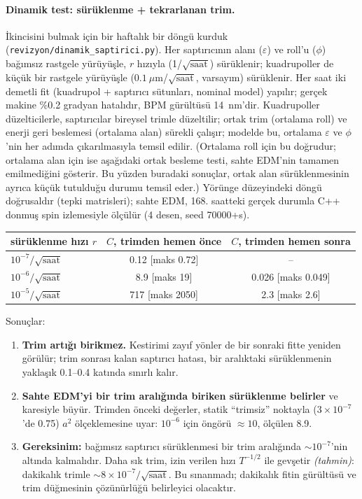 \documentclass[11pt,a4paper]{article}
\newcommand{\tahmin}{\textit{(tahmin)}}
\begin{document}
\paragraph{Dinamik test: sürüklenme + tekrarlanan trim.} İkincisini bulmak için bir haftalık bir döngü kurduk
(\texttt{revizyon/dinamik\_saptirici.py}). Her saptırıcının alanı ($\varepsilon$) ve roll'u ($\phi$) bağımsız
rastgele yürüyüşle, $r$ hızıyla (1/$\sqrt{\text{saat}}$) sürüklenir; kuadrupoller de küçük bir rastgele
yürüyüşle ($0.1~\mu$m/$\sqrt{\text{saat}}$, varsayım) sürüklenir. Her saat iki demetli fit (kuadrupol +
saptırıcı sütunları, nominal model) yapılır; gerçek makine \%0.2 gradyan hatalıdır, BPM gürültüsü 14~nm'dir.
Kuadrupoller düzelticilerle, saptırıcılar bireysel trimle düzeltilir; ortak trim (ortalama roll) ve enerji
geri beslemesi (ortalama alan) sürekli çalışır; modelde bu, ortalama $\varepsilon$ ve $\phi$'nin her adımda
çıkarılmasıyla temsil edilir. (Ortalama roll için bu doğrudur; ortalama alan için ise aşağıdaki ortak besleme
testi, sahte EDM'nin tamamen emilmediğini gösterir. Bu yüzden buradaki sonuçlar, ortak alan sürüklenmesinin
ayrıca küçük tutulduğu durumu temsil eder.) Yörünge düzeyindeki döngü doğrusaldır (tepki matrisleri);
sahte EDM, 168. saatteki gerçek durumla C++ donmuş spin izlemesiyle ölçülür (4 desen, seed 70000+s).
\begin{center}\footnotesize
\begin{tabular}{lcc}\toprule
sürüklenme hızı $r$ & $C$, trimden hemen önce & $C$, trimden hemen sonra\\\midrule
$10^{-7}/\sqrt{\text{saat}}$ & 0.12 [maks 0.72] & --\\
$10^{-6}/\sqrt{\text{saat}}$ & 8.9 [maks 19] & 0.026 [maks 0.049]\\
$10^{-5}/\sqrt{\text{saat}}$ & 717 [maks 2050] & 2.3 [maks 2.6]\\\bottomrule
\end{tabular}\end{center}
Sonuçlar:
\begin{enumerate}
\item \textbf{Trim artığı birikmez.} Kestirimi zayıf yönler de bir sonraki fitte yeniden görülür; trim
sonrası kalan saptırıcı hatası, bir aralıktaki sürüklenmenin yaklaşık 0.1--0.4 katında sınırlı kalır.
\item \textbf{Sahte EDM'yi bir trim aralığında biriken sürüklenme belirler} ve karesiyle büyür. Trimden önceki
değerler, statik ``trimsiz'' noktayla ($3\times10^{-7}$'de 0.75) $a^2$ ölçeklemesine uyar: $10^{-6}$ için
öngörü $\approx10$, ölçülen 8.9.
\item \textbf{Gereksinim:} bağımsız saptırıcı sürüklenmesi bir trim aralığında $\sim10^{-7}$'nin altında
kalmalıdır. Daha sık trim, izin verilen hızı $T^{-1/2}$ ile gevşetir \tahmin: dakikalık trimle
$\sim8\times10^{-7}/\sqrt{\text{saat}}$. Bu sınanmadı; dakikalık fitin gürültüsü ve trim düğmesinin
çözünürlüğü belirleyici olacaktır.
\end{enumerate}
\end{document}
